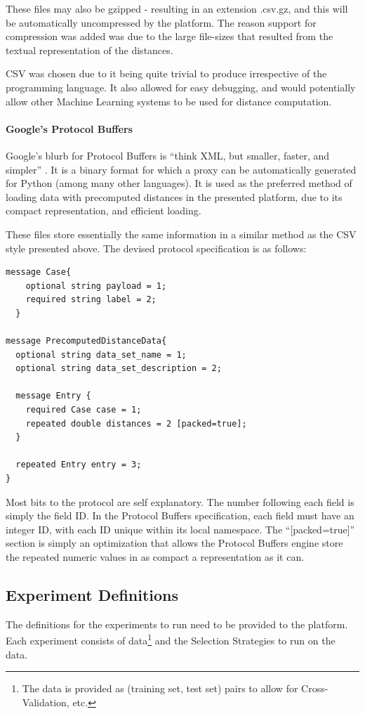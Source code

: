 \documentclass[a4paper,11pt]{report}
\begin{document}
These files may also be gzipped - resulting in an extension .csv.gz, and this will be automatically uncompressed by the platform. The reason support for compression was added was due to the large file-sizes that resulted from the textual representation of the distances.

CSV was chosen due to it being quite trivial to produce irrespective of the programming language. It also allowed for easy debugging, and would potentially allow other Machine Learning systems to be used for distance computation.

\paragraph{Google's Protocol Buffers \citep{prog:protocolbuffers}}

Google's blurb for Protocol Buffers is ``think XML, but smaller, faster, and simpler'' \citep{prog:protocolbuffers}. It is a binary format for which a proxy can be automatically generated for Python (among many other languages). It is used as the preferred method of loading data with precomputed distances in the presented platform, due to its compact representation, and efficient loading.

\begin{samepage}
These files store essentially the same information in a similar method as the CSV style presented above. The devised protocol specification is as follows:
\begin{verbatim}
message Case{
    optional string payload = 1;
    required string label = 2;
  }

message PrecomputedDistanceData{
  optional string data_set_name = 1;
  optional string data_set_description = 2;
  
  message Entry {
    required Case case = 1;
    repeated double distances = 2 [packed=true];
  }
  
  repeated Entry entry = 3;
}
\end{verbatim}

\end{samepage}
Most bits to the protocol are self explanatory. The number following each field is simply the field ID. In the Protocol Buffers specification, each field must have an integer ID, with each ID unique within its local namespace. The ``[packed=true]'' section is simply an optimization that allows the Protocol Buffers engine store the repeated numeric values in as compact a representation as it can.

\subsection{Experiment Definitions}
The definitions for the experiments to run need to be provided to the platform. Each experiment consists of data\footnote{ The data is provided as (training set, test set) pairs to allow for Cross-Validation, etc.} and the Selection Strategies to run on the data.
\end{document}
